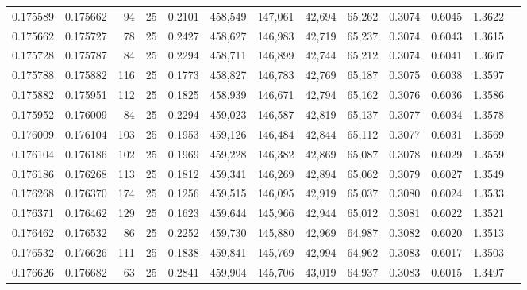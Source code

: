 \begin{tabular}{rrrrrrrrrrrrr}
0.175589 & 0.175662 &    94 &  25 &                                     0.2101 & 458,549 & 147,061 &  42,694 &  65,262 & 0.3074 & 0.6045 & 1.3622 \\
0.175662 & 0.175727 &    78 &  25 &                                     0.2427 & 458,627 & 146,983 &  42,719 &  65,237 & 0.3074 & 0.6043 & 1.3615 \\
0.175728 & 0.175787 &    84 &  25 &                                     0.2294 & 458,711 & 146,899 &  42,744 &  65,212 & 0.3074 & 0.6041 & 1.3607 \\
0.175788 & 0.175882 &   116 &  25 &                                     0.1773 & 458,827 & 146,783 &  42,769 &  65,187 & 0.3075 & 0.6038 & 1.3597 \\
0.175882 & 0.175951 &   112 &  25 &                                     0.1825 & 458,939 & 146,671 &  42,794 &  65,162 & 0.3076 & 0.6036 & 1.3586 \\
0.175952 & 0.176009 &    84 &  25 &                                     0.2294 & 459,023 & 146,587 &  42,819 &  65,137 & 0.3077 & 0.6034 & 1.3578 \\
0.176009 & 0.176104 &   103 &  25 &                                     0.1953 & 459,126 & 146,484 &  42,844 &  65,112 & 0.3077 & 0.6031 & 1.3569 \\
0.176104 & 0.176186 &   102 &  25 &                                     0.1969 & 459,228 & 146,382 &  42,869 &  65,087 & 0.3078 & 0.6029 & 1.3559 \\
0.176186 & 0.176268 &   113 &  25 &                                     0.1812 & 459,341 & 146,269 &  42,894 &  65,062 & 0.3079 & 0.6027 & 1.3549 \\
0.176268 & 0.176370 &   174 &  25 &                                     0.1256 & 459,515 & 146,095 &  42,919 &  65,037 & 0.3080 & 0.6024 & 1.3533 \\
0.176371 & 0.176462 &   129 &  25 &                                     0.1623 & 459,644 & 145,966 &  42,944 &  65,012 & 0.3081 & 0.6022 & 1.3521 \\
0.176462 & 0.176532 &    86 &  25 &                                     0.2252 & 459,730 & 145,880 &  42,969 &  64,987 & 0.3082 & 0.6020 & 1.3513 \\
0.176532 & 0.176626 &   111 &  25 &                                     0.1838 & 459,841 & 145,769 &  42,994 &  64,962 & 0.3083 & 0.6017 & 1.3503 \\
0.176626 & 0.176682 &    63 &  25 &                                     0.2841 & 459,904 & 145,706 &  43,019 &  64,937 & 0.3083 & 0.6015 & 1.3497 \\

\end{tabular}
